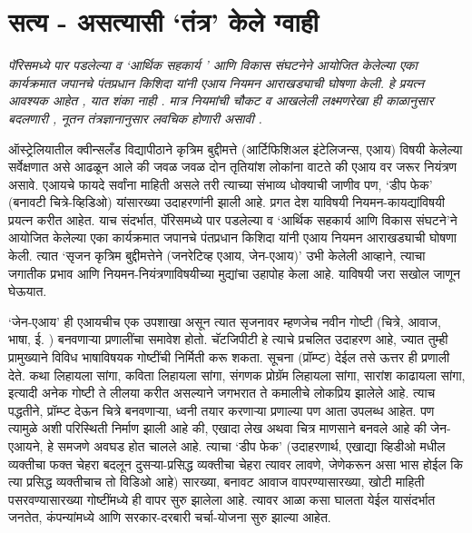 \chapter{सत्य - असत्यासी `तंत्र' केले ग्वाही}

{\textit{पॅरिसमध्ये पार पडलेल्या व `आर्थिक सहकार्य '  आणि विकास संघटनेने आयोजित केलेल्या एका कार्यक्रमात जपानचे पंतप्रधान किशिदा यांनी एआय नियमन आराखड्याची घोषणा केली. हे प्रयत्न आवश्यक आहेत ,  यात शंका नाही .  मात्र नियमांची चौकट व आखलेली लक्ष्मणरेखा ही काळानुसार बदलणारी , नूतन तंत्रज्ञानानुसार लवचिक होणारी असावी . }}

\vspace{1.5em}

ऑस्ट्रेलियातील क्वीन्सलँड विद्यापीठाने कृत्रिम बुद्दीमत्ते (आर्टिफिशिअल इंटेलिजन्स, एआय) विषयी केलेल्या सर्वेक्षणात असे आढळून आले की जवळ जवळ दोन तृतियांश लोकांना वाटते की एआय वर जरूर नियंत्रण असावे. एआयचे फायदे सर्वांना माहिती असले तरी त्याच्या संभाव्य धोक्याची जाणीव पण, `डीप फेक' (बनावटी चित्रे-व्हिडिओ) यांसारख्या उदाहरणांनी झाली आहे. प्रगत देश याविषयी नियमन-कायद्यांविषयी प्रयत्न करीत आहेत. याच संदर्भात, पॅरिसमध्ये पार पडलेल्या व `आर्थिक सहकार्य आणि विकास संघटने'ने आयोजित केलेल्या एका कार्यक्रमात जपानचे पंतप्रधान किशिदा यांनी एआय नियमन आराखड्याची घोषणा केली. त्यात `सृजन कृत्रिम बुद्दीमत्तेने (जनरेटिव्ह एआय, जेन-एआय)'  उभी केलेली आव्हाने, त्याचा जगातीक प्रभाव आणि नियमन-नियंत्रणाविषयीच्या मुद्यांचा उहापोह केला आहे. याविषयी जरा सखोल जाणून घेऊयात.

`जेन-एआय' ही एआयचीच एक उपशाखा असून त्यात सृजनावर म्हणजेच नवीन गोष्टी (चित्रे, आवाज, भाषा, ई. ) बनवणाऱ्या प्रणालींचा समावेश होतो. चॅटजिपीटी हे त्याचे प्रचलित उदाहरण आहे, ज्यात तुम्ही प्रामुख्याने विविध भाषाविषयक गोष्टींची निर्मिती करू शकता. सूचना (प्रॉम्प्ट) देईल तसे ऊत्तर ही प्रणाली देते. कथा लिहायला सांगा, कविता लिहायला सांगा, संगणक प्रोग्रॅम लिहायला सांगा, सारांश काढायला सांगा, इत्यादी अनेक गोष्टी ते लीलया करीत असल्याने जगभरात ते कमालीचे लोकप्रिय झालेले आहे. त्याच पद्धतीने, प्रॉम्प्ट देऊन चित्रे बनवणाऱ्या, ध्वनी तयार करणाऱ्या प्रणाल्या पण आता उपलब्ध आहेत. पण त्यामुळे अशी परिस्थिती निर्माण झाली आहे की, एखादा लेख अथवा चित्र माणसाने बनवले आहे की जेन-एआयने, हे समजणे अवघड होत चालले आहे. त्याचा `डीप फेक' (उदाहरणार्थ, एखाद्या व्हिडीओ मधील व्यक्तीचा फक्त चेहरा बदलून दुसऱ्या-प्रसिद्ध व्यक्तीचा चेहरा त्यावर लावणे, जेणेकरून असा भास होईल कि त्या प्रसिद्ध व्यक्तीचाच तो विडिओ आहे) सारख्या, बनावट आवाज वापरण्यासारख्या, खोटी माहिती पसरवण्यासारख्या गोष्टींमध्ये ही वापर सुरु झालेला आहे. त्यावर आळा कसा घालता येईल यासंदर्भात जनतेत, कंपन्यांमध्ये आणि सरकार-दरबारी चर्चा-योजना सुरु झाल्या आहेत.

